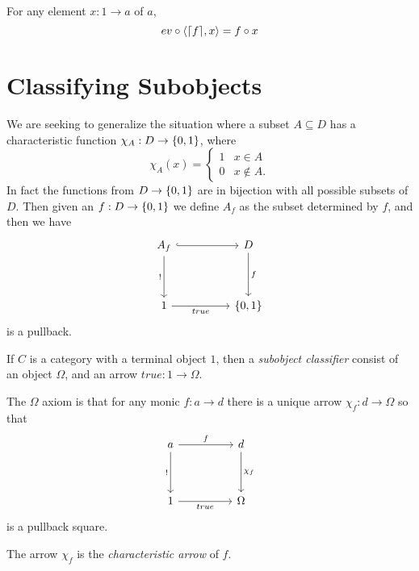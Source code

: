     \begin{exercise}
        For any element $x : 1 \to a$ of $a$,
        $$ev \circ \langle \lceil f \rceil, x \rangle = f \circ x$$
    \end{exercise}


\section{Classifying Subobjects}
    We are seeking to generalize the situation where a subset $A \subseteq D$ has a characteristic function $\chi_A : D \to \left\{0,1\right\}$, where 
        \[ \chi_A(x) =\begin{cases} 
              1 & x \in A \\
              0 & x \notin A.
           \end{cases}
        \]
    In fact the functions from $D \to \left\{0,1\right\}$ are in bijection with all possible subsets of $D$.
    Then given an $f : D \to \left\{0,1\right\}$ we define $A_f$ as the subset determined by $f$, and then we have
    \[\begin{tikzcd}
        {A_f} && {D} \\
        \\
        {1} && {\{0,1\}}
        \arrow[from=1-1, to=1-3, hook]
        \arrow["{!}"', from=1-1, to=3-1]
        \arrow["{f}", from=1-3, to=3-3]
        \arrow["{true}"', from=3-1, to=3-3]
    \end{tikzcd}\]
    is a pullback.

    \begin{defi} \label{subobject classifier}
        If $C$ is a category with a terminal object $1$, then a \emph{subobject classifier} consist of an object
        $\Omega$, and an arrow $true : 1 \to \Omega$.

        The $\Omega$ axiom is that for any monic $f : a \to d$ there is a unique arrow $\chi_f : d \to \Omega$ so that
        \[\begin{tikzcd}
            {a} && {d} \\
            \\
            {1} && {\Omega}
            \arrow["{f}", from=1-1, to=1-3]
            \arrow["{!}"', from=1-1, to=3-1]
            \arrow["{\chi_f}", from=1-3, to=3-3]
            \arrow["{true}"', from=3-1, to=3-3]
        \end{tikzcd}\]
        is a pullback square.

        The arrow $\chi_f$ is the \emph{characteristic arrow} of $f$.
    \end{defi}


